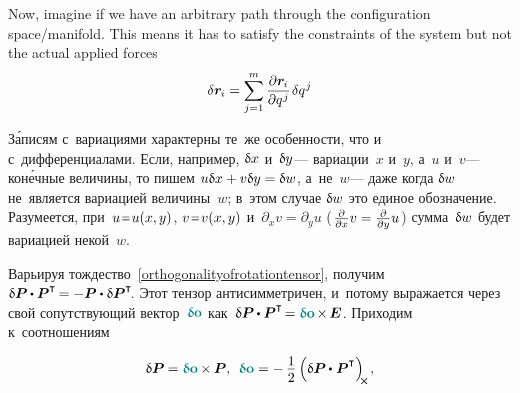 \begin{otherlanguage}{russian}
{Now, imagine if we have an arbitrary path through the configuration space/manifold. This means it has to satisfy the constraints of the system but not the actual applied forces
\[\displaystyle \delta \bm{r}_{\hspace{-0.1ex}i} = \sum _{j=1}^{m} {\frac {\partial \bm{r}_{\hspace{-0.1ex}i}}{\partial q^{\hspace{.1ex}j}}} \hspace{.2ex} \delta q^{\hspace{.1ex}j}\]

\par}



З\'{а}писям с~вариациями характерны те~же особенности, что и с~дифференциалами.
Если, например, ${\updelta\hspace{-0.1ex}x}$ и~${\updelta\hspace{-0.1ex}y}$\:--- вариации~$x$ и~$y$, а~$u$ и~$v$\:--- кон\'{е}чные величины, то пишем ${u \updelta\hspace{-0.1ex}x + v \updelta\hspace{-0.1ex}y = \updelta\hspace{-0.1ex}w}$, а~не~$w$\:--- даже когда ${\updelta\hspace{-0.1ex}w}$ не~является вариацией величины~$w$; в~этом случае ${\updelta\hspace{-0.1ex}w}$ это единое обозначение.
Разумеется, при~${u \narroweq u(x,y)}$, ${v \narroweq v(x,y)}$ и~${\partial_x v = \partial_y u}$ (${\hspace{.16ex}\frac{\partial}{\partial x} v = \frac{\partial}{\partial y} u\hspace{.16ex}}$) сумма~${\updelta\hspace{-0.1ex}w}$ будет вариацией некой~$w$.

Варьируя тождество~\eqref{orthogonalityofrotationtensor}, получим ${\variation{\bm{P}} \hspace{-0.08ex} \dotp \bm{P}^{\T} \hspace{-0.2ex} = - \bm{P} \dotp \variation{\bm{P}}^{\T}\!}$.
Этот тензор антисимметричен, и~потому выражается через свой сопутствующий вектор~${\varvector{o}}$ как~${\variation{\bm{P}} \hspace{-0.08ex} \dotp \bm{P}^{\T} \hspace{-0.3ex} = \varvector{o} \hspace{-0.2ex} \times \hspace{-0.2ex} \UnitDyad}$.
Приходим к~соотношениям

\nopagebreak\vspace{-0.5em}\begin{equation}
\variation{\bm{P}} \hspace{-0.1ex} = \varvector{o} \hspace{-0.1ex} \times \hspace{-0.1ex} \bm{P} , \:\:
\varvector{o} = - \, \displaystyle \onehalf \left( { \variation{\bm{P}} \hspace{-0.08ex} \dotp^{\mathstrut} \bm{P}^{\T} } \right)_{\hspace{-0.25em}\Xcompanion} \hspace{-0.1ex} ,
\end{equation}


\end{otherlanguage}
